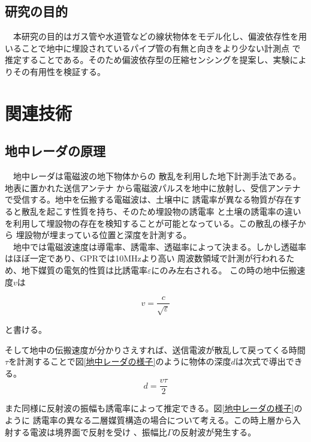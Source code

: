 \documentclass[12pt,a4paper]{jsreport}
\begin{document}
\section{研究の目的}
　本研究の目的はガス管や水道管などの線状物体をモデル化し、偏波依存性を用いることで地中に埋設されているパイプ管の有無と向きをより少ない計測点
で推定することである。そのため偏波依存型の圧縮センシングを提案し、実験によりその有用性を検証する。

\chapter{関連技術}
\section{地中レーダの原理}
　地中レーダは電磁波の地下物体からの
散乱を利用した地下計測手法である。地表に置かれた送信アンテナ
から電磁波パルスを地中に放射し、受信アンテナで受信する。地中を伝搬する電磁波は、土壌中に
誘電率が異なる物質が存在すると散乱を起こす性質を持ち、そのため埋設物の誘電率
と土壌の誘電率の違いを利用して埋設物の存在を検知することが可能となっている。この散乱の様子から
埋設物が埋まっている位置と深度を計測する。
\\　地中では電磁波速度は導電率、誘電率、透磁率によって決まる。しかし透磁率はほぼ一定であり、GPRでは10MHzより高い
周波数領域で計測が行われるため、地下媒質の電気的性質は比誘電率$\varepsilon$にのみ左右される。
この時の地中伝搬速度$v$は

\begin{equation}
  v =
  \frac{c}{\sqrt{\varepsilon}} 
  \end{equation}

と書ける。

そして地中の伝搬速度が分かりさえすれば、送信電波が散乱して戻ってくる時間
$\tau$を計測することで図\ref{地中レーダの様子}のように物体の深度$d$は次式で導出できる。
    \begin{equation}
        d=
        \frac{v \tau}{2} 
    \end{equation}

また同様に反射波の振幅も誘電率によって推定できる。図\ref{地中レーダの様子}のように
誘電率の異なる二層媒質構造の場合について考える。この時上層から入射する電波は境界面で反射を受け
、振幅比$\Gamma$の反射波が発生する。
\end{document}
